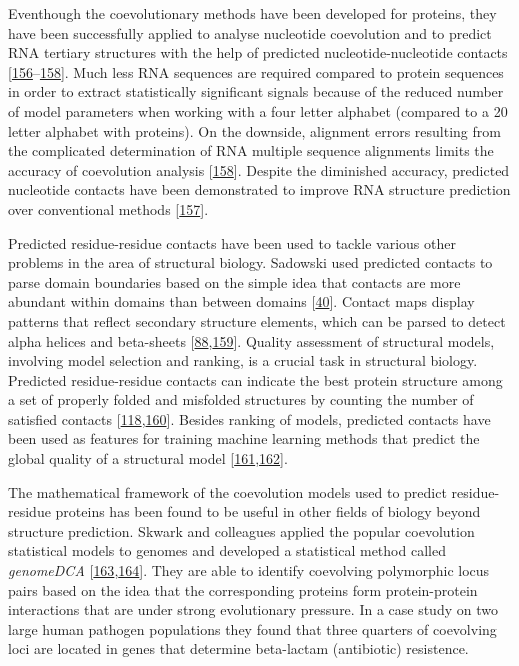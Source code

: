 \documentclass[11pt,a4paper,twoside]{book}
\theoremstyle{definition}
\theoremstyle{definition}
\theoremstyle{remark}
\begin{document}
Eventhough the coevolutionary methods have been developed for proteins,
they have been successfully applied to analyse nucleotide coevolution
and to predict RNA tertiary structures with the help of predicted
nucleotide-nucleotide contacts
{[}\protect\hyperlink{ref-Nawy2016}{156}--\protect\hyperlink{ref-DeLeonardis2015a}{158}{]}.
Much less RNA sequences are required compared to protein sequences in
order to extract statistically significant signals because of the
reduced number of model parameters when working with a four letter
alphabet (compared to a 20 letter alphabet with proteins). On the
downside, alignment errors resulting from the complicated determination
of RNA multiple sequence alignments limits the accuracy of coevolution
analysis {[}\protect\hyperlink{ref-DeLeonardis2015a}{158}{]}. Despite
the diminished accuracy, predicted nucleotide contacts have been
demonstrated to improve RNA structure prediction over conventional
methods {[}\protect\hyperlink{ref-Weinreb2015}{157}{]}.

Predicted residue-residue contacts have been used to tackle various
other problems in the area of structural biology. Sadowski used
predicted contacts to parse domain boundaries based on the simple idea
that contacts are more abundant within domains than between domains
{[}\protect\hyperlink{ref-Sadowski2013}{40}{]}. Contact maps display
patterns that reflect secondary structure elements, which can be parsed
to detect alpha helices and beta-sheets
{[}\protect\hyperlink{ref-Andreani2015a}{88},\protect\hyperlink{ref-SuvarnaVani2018}{159}{]}.
Quality assessment of structural models, involving model selection and
ranking, is a crucial task in structural biology. Predicted
residue-residue contacts can indicate the best protein structure among a
set of properly folded and misfolded structures by counting the number
of satisfied contacts
{[}\protect\hyperlink{ref-Tress2010}{118},\protect\hyperlink{ref-Wozniak2017}{160}{]}.
Besides ranking of models, predicted contacts have been used as features
for training machine learning methods that predict the global quality of
a structural model
{[}\protect\hyperlink{ref-Cao2016}{161},\protect\hyperlink{ref-Terashi2014a}{162}{]}.

The mathematical framework of the coevolution models used to predict
residue-residue proteins has been found to be useful in other fields of
biology beyond structure prediction. Skwark and colleagues applied the
popular coevolution statistical models to genomes and developed a
statistical method called \emph{genomeDCA}
{[}\protect\hyperlink{ref-Skwark2017}{163},\protect\hyperlink{ref-Gao2017}{164}{]}.
They are able to identify coevolving polymorphic locus pairs based on
the idea that the corresponding proteins form protein-protein
interactions that are under strong evolutionary pressure. In a case
study on two large human pathogen populations they found that three
quarters of coevolving loci are located in genes that determine
beta-lactam (antibiotic) resistence.
\end{document}
